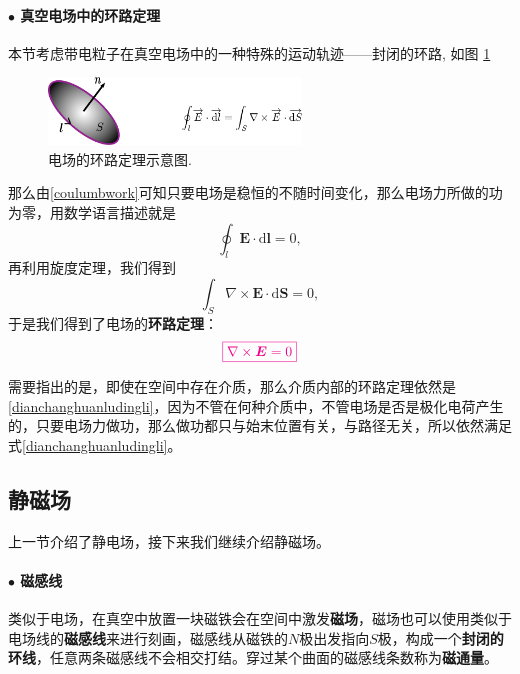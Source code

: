 \documentclass[10pt,reqno, final]{ctexart}
\begin{document}
\paragraph{$\bullet$ 真空电场中的环路定理} 本节考虑带电粒子在真空电场中的一种特殊的运动轨迹——封闭的环路, 如图 \ref{dianchanghuanlu}
\begin{figure}[htp]
	\centering
	\includegraphics[width=0.6\textwidth]{Figures/dianchanghuanludingli}
	\caption {电场的环路定理示意图. }
	\label{dianchanghuanlu}
\end{figure}

那么由\eqref{coulumbwork}可知只要电场是稳恒的不随时间变化，那么电场力所做的功为零，用数学语言描述就是
\begin{equation}
\oint_l \bm{E}\cdot \mathrm{d}\bm{l} = 0,
\end{equation}
再利用旋度定理，我们得到
\begin{equation}
\int_S \nabla \times \bm{E} \cdot \mathrm{d}\bm{S} = 0,
\end{equation}
于是我们得到了电场的\textbf{环路定理}：
\begin{equation}\label{dianchanghuanludingli}
\color{magenta}\boxed{\nabla\times\bm{E} = 0}
\end{equation}

需要指出的是，即使在空间中存在介质，那么介质内部的环路定理依然是\eqref{dianchanghuanludingli}，因为不管在何种介质中，不管电场是否是极化电荷产生的，只要电场力做功，那么做功都只与始末位置有关，与路径无关，所以依然满足式\eqref{dianchanghuanludingli}。

\subsection{静磁场} 上一节介绍了静电场，接下来我们继续介绍静磁场。
\paragraph{$\bullet$ 磁感线} 类似于电场，在真空中放置一块磁铁会在空间中激发\textbf{磁场}，磁场也可以使用类似于电场线的\textbf{磁感线}来进行刻画，磁感线从磁铁的$N$极出发指向$S$极，构成一个\textbf{封闭的环线}，任意两条磁感线不会相交打结。穿过某个曲面的磁感线条数称为\textbf{磁通量}。
\end{document}
